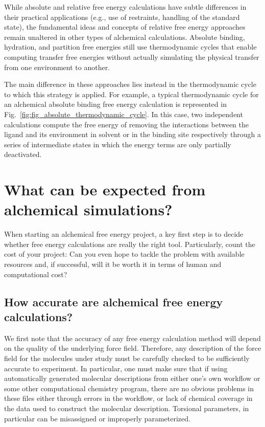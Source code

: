\documentclass[9pt,bestpractices]{livecoms}
\begin{document}
While absolute and relative free energy calculations have subtle differences in their practical applications (e.g., use of restraints, handling of the standard state), the fundamental ideas and concepts of relative free energy approaches remain unaltered in other types of alchemical calculations.
Absolute binding, hydration, and partition free energies still use thermodynamic cycles that enable computing transfer free energies without actually simulating the physical transfer from one environment to another.

The main difference in these approaches lies instead in the thermodynamic cycle to which this strategy is applied.
For example, a typical thermodynamic cycle for an alchemical absolute binding free energy calculation is represented in Fig.~\ref{fig:fig_absolute_thermodynamic_cycle}.
In this case, two independent calculations compute the free energy of removing the interactions between the ligand and its environment in solvent or in the binding site respectively through a series of intermediate states in which the energy terms are only partially deactivated.




\section{What can be expected from alchemical simulations?}
\label{sec:step0}
When starting an alchemical free energy project, a key first step is to decide whether free energy calculations are really the right tool. Particularly, count the cost of your
project: Can you even hope to tackle the problem with available resources and, if successful, will it
be worth it in terms of human and computational cost?

\subsection{How accurate are alchemical free energy calculations?}
\label{subsec:expectation}
We first note that the accuracy of any free energy calculation method will depend on the quality of the underlying force field.  Therefore, any description of the force field for the molecules under study must be carefully checked to be sufficiently accurate to experiment. In particular, one must make sure that if using automatically generated molecular descriptions from either one's own workflow or some other computational chemistry program, there are no obvious problems in these files either through errors in the workflow, or lack of chemical coverage in the data used to construct the molecular description. Torsional parameters, in particular can be misassigned or improperly parameterized. 
\end{document}
